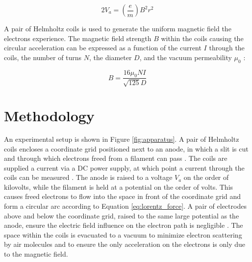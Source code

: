 \documentclass[11pt]{article}
\begin{document}
\begin{equation}
  \label{eq:lin_regress}
  2V_a = \left ( \frac{e}{m} \right ) B^2 r^2
\end{equation}

\vspace{1em}

A pair of Helmholtz coils is used to generate the uniform magnetic
field the electrons experience. The magnetic field strength $B$
within the coils causing the
circular acceleration can be
expressed as a function of the current $I$ through the coils, the number of
turns $N$, the diameter $D$, and the vacuum
permeability $\mu_0$ \cite{helm}:

\begin{equation}
  \label{eq:magnetic_field_equation}
  B = \frac{16 \mu_0 N I }{\sqrt{125} D}
\end{equation}

\section{Methodology}

An experimental setup is shown in Figure \ref{fig:apparatus}. A pair
of Helmholtz coils encloses a coordinate grid positioned next to an
anode, in which a slit is cut and through which electrons freed from a
filament can pass \cite{thomp, young}. The coils are supplied a
current via a DC power supply,
at which point a current through the coils can be measured
\cite{helm, young}. The anode is raised
to a voltage $V_a$ on the order of kilovolts, while the filament is
held at a potential on the order of volts. This causes freed electrons to
flow into the space in front of the coordinate grid and form a circular arc
according to Equation \ref{eq:lorentz_force}. A pair of
electrodes above and below the coordinate grid, raised to the same
large potential as the anode, ensure the electric field influence on
the electron
path is negligible \cite{griff}. The space within the coils is evacuated to a
vacuum to minimize electron scattering by air molecules and to ensure the only
acceleration on the electrons is only due to the magnetic field.
\end{document}
